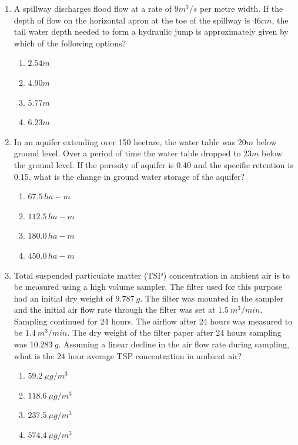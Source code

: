 \documentclass[journal,12pt,onecolumn]{IEEEtran}
\theoremstyle{remark}
\begin{document}
\begin{enumerate}
\item A spillway discharges flood flow at a rate of $9m^3/s$ per metre width. If the depth of flow on the horizontal apron at the toe of the spillway is $46cm$, the tail water depth needed to form a hydraulic jump is approximately given by which of the following options?

\hfill{}
\begin{enumerate}
\item $2.54m$
\item $4.90m$
\item $5.77m$
\item $6.23m$
\end{enumerate}

\item In an aquifer extending over 150 hectare, the water table was $20m$ below ground level. Over a period of time the water table dropped to $23m$ below the ground level. If the porosity of aquifer is 0.40 and the specific retention is 0.15, what is the change in ground water storage of the aquifer?

\hfill{}
\begin{enumerate}
\item $67.5 \,ha-m$
\item $112.5 \,ha-m$
\item $180.0 \, ha-m$
\item $450.0 \,ha-m$
\end{enumerate}

\item Total suspended particulate matter (TSP) concentration in ambient air is to be measured using a high volume sampler. The filter used for this purpose had an initial dry weight of $9.787~g$. The filter was mounted in the sampler and the initial air flow rate through the filter was set at $1.5~m^3/min$. Sampling continued for 24 hours. The airflow after 24 hours was measured to be $1.4~m^3/min$. The dry weight of the filter paper after 24 hours sampling was $10.283~g$. Assuming a linear decline in the air flow rate during sampling, what is the 24 hour average TSP concentration in ambient air?

\hfill{}
\begin{enumerate}
\item $59.2~\mu g/m^3$
\item $118.6~\mu g/m^3$
\item $237.5~\mu g/m^3$
\item $574.4~\mu g/m^3$
\end{enumerate}


\end{enumerate}
\end{document}
